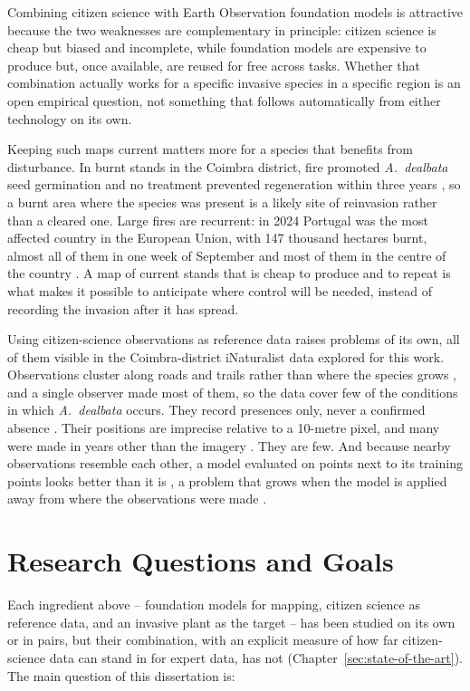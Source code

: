 Combining citizen science with Earth Observation foundation models is
attractive because the two weaknesses are complementary in principle:
citizen science is cheap but biased and incomplete, while foundation
models are expensive to produce but, once available, are reused for
free across tasks. Whether that combination actually works for a
specific invasive species in a specific region is an open empirical
question, not something that follows automatically from either
technology on its own.

Keeping such maps current matters more for a species that benefits
from disturbance. In burnt stands in the Coimbra district, fire
promoted \emph{A.~dealbata} seed germination and no treatment
prevented regeneration within three years \cite{riveiro2025}, so a
burnt area where the species was present is a likely site of
reinvasion rather than a cleared one.
Large fires are recurrent: in 2024 Portugal was the most affected
country in the European Union, with 147 thousand hectares burnt,
almost all of them in one week of September and most of them in the
centre of the country \cite{sanmiguel2025}. A map of current stands
that is cheap to produce and to repeat is what makes it possible to
anticipate where control will be needed, instead of recording the
invasion after it has spread.

Using citizen-science observations as reference data raises problems
of its own, all of them visible in the Coimbra-district iNaturalist
data explored for this work. Observations cluster along roads and
trails rather than where the species grows \cite{dimson2023}, and a
single observer made most of them, so the data cover few of the
conditions in which \emph{A.~dealbata} occurs. They record presences
only, never a confirmed absence \cite{phillips2009}. Their positions
are imprecise relative to a 10-metre pixel, and many were made in
years other than the imagery \cite{ball2026}. They are few. And
because nearby observations resemble each other, a model evaluated on
points next to its training points looks better than it is
\cite{karasiak2022}, a problem that grows when the model is applied
away from where the observations were made \cite{zhu2026}.

\section{Research Questions and Goals}
\label{sec:introduction-rqs}

Each ingredient above -- foundation models for mapping, citizen
science as reference data, and an invasive plant as the target -- has
been studied on its own or in pairs, but their combination, with an
explicit measure of how far citizen-science data can stand in for
expert data, has not (Chapter~\ref{sec:state-of-the-art}). The main
question of this dissertation is:

